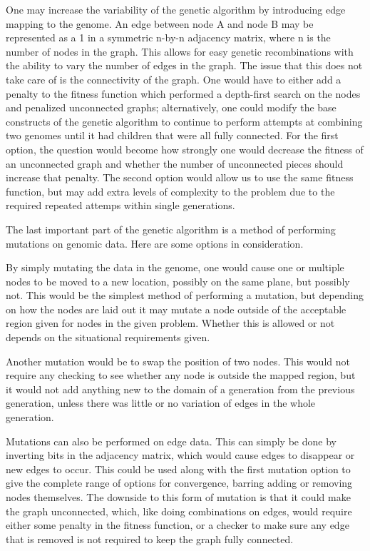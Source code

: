 \documentclass[10pt]{article}
\begin{document}
One may increase the variability of the genetic algorithm by introducing edge mapping to the genome.  An edge between node A and node B may be represented as a 1 in a symmetric n-by-n adjacency matrix, where n is the number of nodes in the graph.  This allows for easy genetic recombinations with the ability to vary the number of edges in the graph.  The issue that this does not take care of is the connectivity of the graph.  One would have to either add a penalty to the fitness function which performed a depth-first search on the nodes and penalized unconnected graphs; alternatively, one could modify the base constructs of the genetic algorithm to continue to perform attempts at combining two genomes until it had children that were all fully connected.  For the first option, the question would become how strongly one would decrease the fitness of an unconnected graph and whether the number of unconnected pieces should increase that penalty.  The second option would allow us to use the same fitness function, but may add extra levels of complexity to the problem due to the required repeated attemps within single generations.

The last important part of the genetic algorithm is a method of performing mutations on genomic data.  Here are some options in consideration.

By simply mutating the data in the genome, one would cause one or multiple nodes to be moved to a new location, possibly on the same plane, but possibly not.  This would be the simplest method of performing a mutation, but depending on how the nodes are laid out it may mutate a node outside of the acceptable region given for nodes in the given problem.  Whether this is allowed or not depends on the situational requirements given.

Another mutation would be to swap the position of two nodes.  This would not require any checking to see whether any node is outside the mapped region, but it would not add anything new to the domain of a generation from the previous generation, unless there was little or no variation of edges in the whole generation.

Mutations can also be performed on edge data.  This can simply be done by inverting bits in the adjacency matrix, which would cause edges to disappear or new edges to occur.  This could be used along with the first mutation option to give the complete range of options for convergence, barring adding or removing nodes themselves.  The downside to this form of mutation is that it could make the graph unconnected, which, like doing combinations on edges, would require either some penalty in the fitness function, or a checker to make sure any edge that is removed is not required to keep the graph fully connected.
\end{document}
